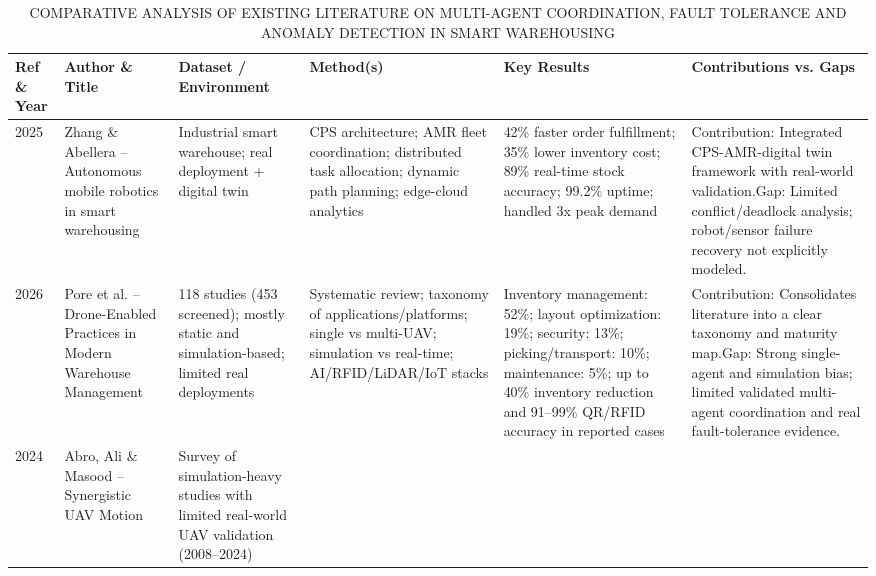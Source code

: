 \documentclass[conference]{IEEEtran}
\begin{document}
\clearpage
\onecolumn
\makeatletter
\setlength{\@fptop}{0pt}
\makeatother
\setlength{\abovecaptionskip}{0pt}
\setlength{\belowcaptionskip}{0pt}
 
\begin{table}[!t]
\centering
\footnotesize
\setlength{\tabcolsep}{4pt}
\renewcommand{\arraystretch}{1.05}
\caption{COMPARATIVE ANALYSIS OF EXISTING LITERATURE ON MULTI-AGENT COORDINATION, FAULT TOLERANCE AND ANOMALY DETECTION IN SMART WAREHOUSING}
\label{LitRevTable_1}
\begin{tabularx}{\linewidth}{@{}L{0.7cm}L{2.0cm}L{2.0cm}L{3.6cm}L{3.8cm}Y@{}}
\toprule
\textbf{Ref \& Year} &
  \textbf{Author \& Title} &
  \textbf{Dataset / Environment} &
  \textbf{Method(s)} &
  \textbf{Key Results} &
  \textbf{Contributions vs. Gaps} \\ \midrule
\cite{zhang2025autonomous} 2025 &
  Zhang \& Abellera -- Autonomous mobile robotics in smart warehousing &
  Industrial smart warehouse; real deployment + digital twin &
  CPS architecture; AMR fleet coordination; distributed task allocation; dynamic path planning; edge-cloud analytics &
  42\% faster order fulfillment; 35\% lower inventory cost; 89\% real-time stock accuracy; 99.2\% uptime; handled 3x peak demand &
  Contribution: Integrated CPS-AMR-digital twin framework with real-world validation.\newline Gap: Limited conflict/deadlock analysis; robot/sensor failure recovery not explicitly modeled. \\ \midrule
\cite{pore2026drone} 2026 &
  Pore et al. -- Drone-Enabled Practices in Modern Warehouse Management &
  118 studies (453 screened); mostly static and simulation-based; limited real deployments &
  Systematic review; taxonomy of applications/platforms; single vs multi-UAV; simulation vs real-time; AI/RFID/LiDAR/IoT stacks &
  Inventory management: 52\%; layout optimization: 19\%; security: 13\%; picking/transport: 10\%; maintenance: 5\%; up to 40\% inventory reduction and 91--99\% QR/RFID accuracy in reported cases &
  Contribution: Consolidates literature into a clear taxonomy and maturity map.\newline Gap: Strong single-agent and simulation bias; limited validated multi-agent coordination and real fault-tolerance evidence. \\ \midrule
\cite{abro2024synergistic} 2024 &
  Abro, Ali \& Masood -- Synergistic UAV Motion &
  Survey of simulation-heavy studies with limited real-world UAV validation (2008--2024) &

\end{tabularx}
\end{table}
\end{document}
